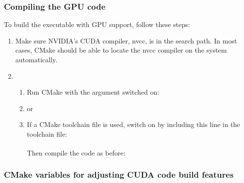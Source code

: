 
\subsubsection{Compiling the GPU code}

To build the executable  with GPU support, follow
these steps:

\begin{enumerate}
  
  \item  Make sure NVIDIA's CUDA compiler, nvcc, is in the search
    path. In most cases, CMake should be able to locate the nvcc
    compiler on the system automatically.
  \item 
    \begin{enumerate}
      \item Run CMake with the argument  switched on: \\

       \item[] \hspace{-0.27in} or

       \item If a CMake toolchain file is used, switch on  by
         including this line in the toolchain file: \\
                \\
                Then compile the code as before: \\
    \end{enumerate}

\end{enumerate}


\subsubsection{CMake variables for adjusting CUDA code build features}

